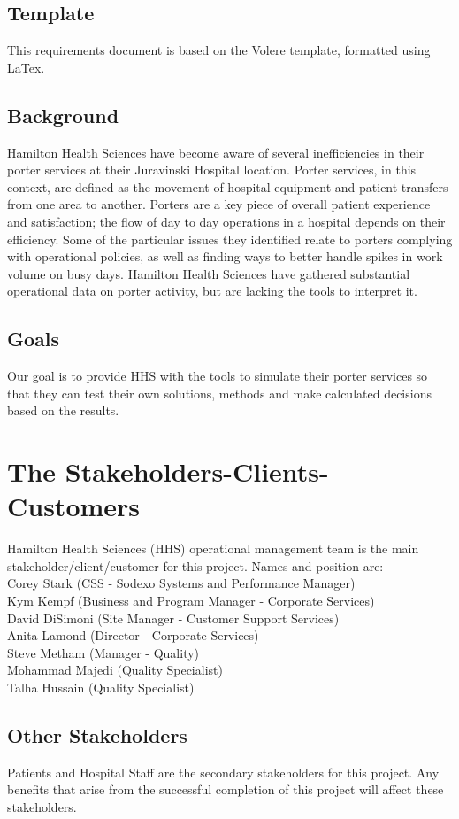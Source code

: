\documentclass[paper=letter, fontsize=10pt]{scrartcl}
\numberwithin{equation}{section}		%
\numberwithin{figure}{section}			%
\numberwithin{table}{section}				%
\begin{document}
\subsection{Template}
This requirements document is based on the Volere template, formatted using LaTex.
\subsection{Background}
Hamilton Health Sciences have become aware of several inefficiencies in their porter services at their Juravinski Hospital location. Porter services, in this context, are defined as the movement of hospital equipment and patient transfers from one area to another. Porters are a key  piece of overall patient experience and satisfaction; the flow of day to day operations in a hospital depends on their efficiency. Some of the particular issues they identified relate to porters complying with operational policies, as well as finding ways to better handle spikes in work volume on busy days. Hamilton Health Sciences have gathered substantial operational data on porter activity, but are lacking the tools to interpret it.
\subsection{Goals}
Our goal is to provide HHS with the tools to simulate their porter services so that they can test their own solutions, methods and make calculated decisions based on the results.

\section{The Stakeholders-Clients-Customers}
Hamilton Health Sciences (HHS) operational management team is the main stakeholder/client/customer for this project. Names and position are: \\
Corey Stark (CSS - Sodexo Systems and Performance Manager)\\
Kym Kempf (Business and Program Manager - Corporate Services)\\
David DiSimoni (Site Manager - Customer Support Services)\\
Anita Lamond (Director - Corporate Services)\\
Steve Metham (Manager - Quality)\\
Mohammad Majedi (Quality Specialist)\\
Talha Hussain (Quality Specialist)
\subsection{Other Stakeholders}
Patients and Hospital Staff are the secondary stakeholders for this project. Any benefits that arise from the successful completion of this project will affect these stakeholders.
\end{document}
